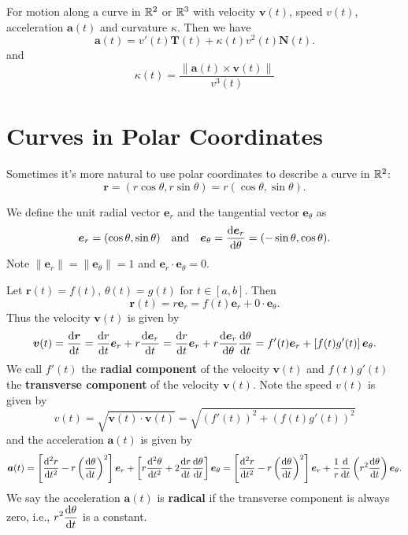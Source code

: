     \begin{theoremenv}
        For motion along a curve in $\mathbb{R}^2$ or $\mathbb{R}^3$ with velocity $\bm v(t)$, speed $v(t)$, acceleration $\bm a(t)$ and curvature $\kappa$. Then we have
        $$ \bm a(t) = v'(t) \bm T(t) + \kappa (t) v^2(t) \bm N(t). $$
        and
        $$ \kappa (t) = \frac{\left\|\bm a (t) \times \bm v (t)\right\|}{v^3 (t)}
        $$
    \end{theoremenv}
    \section{Curves in Polar Coordinates}
    Sometimes it's more natural to use polar coordinates to describe a curve in $\mathbb{R}^2$:
    $$ \bm r = (r \cos \theta, r \sin \theta) = r (\cos \theta, \sin \theta). $$
    \begin{definitionenv}
        We define the unit radial vector $\bm e_r$ and the tangential vector $\bm e_\theta$ as
        $$ \bm e_r = (\cos \theta, \sin \theta) \quad \text{and} \quad \bm e_\theta = \dv{\bm e_r}{\theta} = (-\sin \theta, \cos \theta). $$
        Note $\| \bm e_r\| = \| \bm e_\theta\| = 1$ and $\bm e_r \cdot \bm e_\theta = 0$.
    \end{definitionenv}
    \begin{exampleenv}
        Let $\bm r(t) = f(t)$, $\theta(t) = g(t)$ for $t\in [a,b]$. Then
        $$ \bm r(t) = r \bm e_r = f(t) \bm e_r  + 0 \cdot \bm e_\theta. $$
        Thus the velocity $\bm v(t)$ is given by
        $$ \bm v(t) = \dv{\bm r}{t} = \dv{r}{t} \bm e_r + r \dv{\bm e_r}{t} = \dv{r}{t} \bm e_r + r \dv{\bm e_r}{\theta} \dv{\theta}{t} = f'(t) \bm e_r + \left[ f(t) g'(t)  \right]\bm e_\theta. $$
        We call $f'(t)$ the \textbf{radial component} of the velocity $\bm v(t)$ and $f(t) g'(t)$ the \textbf{transverse component} of the velocity $\bm v(t)$.
        Note the speed $v(t)$ is given by
        $$v(t) =\sqrt{ \bm v(t) \cdot \bm v(t)} = \sqrt{(f'(t))^2 + (f(t) g'(t))^2} $$
        and the acceleration $\bm a(t)$ is given by
        $$\bm a(t) = \left[ \dv[2]{r}{t} - r\left( \dv{\theta}{t} \right)^2 \right] \bm e_r + \left[ r \dv[2]{\theta}{t} + 2 \dv{r}{t} \dv{\theta}{t} \right] \bm e_\theta = \left[ \dv[2]{r}{t} - r\left( \dv{\theta}{t} \right)^2 \right] \bm e_r + \frac1r \frac{\dd}{\dd t} \left( r^2 \dv{\theta}{t} \right) \bm e_\theta .$$
        We say the acceleration $\bm a(t)$ is \textbf{radical} if the transverse component is always zero, i.e., $\displaystyle r^2 \dv{\theta}{t}$ is a constant. 

    \end{exampleenv}

    \newpage